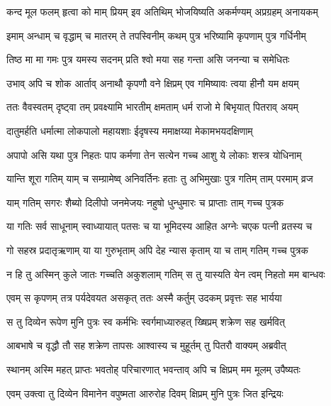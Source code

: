 \twolineshloka
{कन्द मूल फलम् हृत्वा को माम् प्रियम् इव अतिथिम्}
{भोजयिष्यति अकर्मण्यम् अप्रग्रहम् अनायकम्} %

\twolineshloka
{इमाम् अन्धाम् च वृद्धाम् च मातरम् ते तपस्विनीम्}
{कथम् पुत्र भरिष्यामि कृपणाम् पुत्र गर्धिनीम्} %

\twolineshloka
{तिष्ठ मा मा गमः पुत्र यमस्य सदनम् प्रति}
{श्वो मया सह गन्ता असि जनन्या च समेधितः} %

\twolineshloka
{उभाव् अपि च शोक आर्ताव् अनाथौ कृपणौ वने}
{क्षिप्रम् एव गमिष्यावः त्वया हीनौ यम क्षयम्} %

\twolineshloka
{ततः वैवस्वतम् दृष्ट्वा तम् प्रवक्ष्यामि भारतीम्}
{क्षमताम् धर्म राजो मे बिभृयात् पितराव् अयम्} %

\twolineshloka
{दातुमर्हति धर्मात्मा लोकपालो महायशाः}
{ईदृषस्य ममाक्षय्या मेकामभयदक्षिणाम्} %

\twolineshloka
{अपापो असि यथा पुत्र निहतः पाप कर्मणा}
{तेन सत्येन गच्च आशु ये लोकाः शस्त्र योधिनाम्} %

\twolineshloka
{यान्ति शूरा गतिम् याम् च सम्ग्रामेष्व् अनिवर्तिनः}
{हताः तु अभिमुखाः पुत्र गतिम् ताम् परमाम् व्रज} %

\twolineshloka
{याम् गतिम् सगरः शैब्यो दिलीपो जनमेजयः}
{नहुषो धुन्धुमारः च प्राप्ताः ताम् गच्च पुत्रक} %

\twolineshloka
{या गतिः सर्व साधूनाम् स्वाध्यायात् पतसः च या}
{भूमिदस्य आहित अग्नेः चएक पत्नी व्रतस्य च} %

\twolineshloka
{गो सहस्र प्रदातृऋणाम् या या गुरुभृताम् अपि}
{देह न्यास कृताम् या च ताम् गतिम् गच्च पुत्रक} %

\twolineshloka
{न हि तु अस्मिन् कुले जातः गच्चति अकुशलाम् गतिम्}
{स तु यास्यति येन त्वम् निहतो मम बान्धवः} %

\twolineshloka
{एवम् स कृपणम् तत्र पर्यदेवयत असकृत्}
{ततः अस्मै कर्तुम् उदकम् प्रवृत्तः सह भार्यया} %

\twolineshloka
{स तु दिव्येन रूपेण मुनि पुत्रः स्व कर्मभिः}
{स्वर्गमाध्यारुहत् ख्षिप्रम् शक्रेण सह खर्मवित्} %

\twolineshloka
{आबभाषे च वृद्धौ तौ सह शक्रेण तापसः}
{आश्वास्य च मुहूर्तम् तु पितरौ वाक्यम् अब्रवीत्} %

\twolineshloka
{स्थानम् अस्मि महत् प्राप्तः भवतोह् परिचारणात्}
{भवन्ताव् अपि च क्षिप्रम् मम मूलम् उपैष्यतः} %

\twolineshloka
{एवम् उक्त्वा तु दिव्येन विमानेन वपुष्मता}
{आरुरोह दिवम् क्षिप्रम् मुनि पुत्रः जित इन्द्रियः} %

